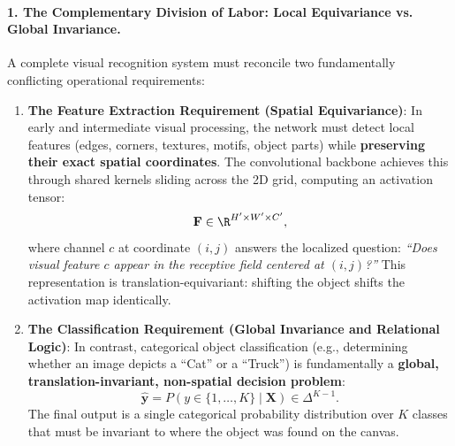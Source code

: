 \paragraph{1. The Complementary Division of Labor: Local Equivariance vs. Global Invariance.}
A complete visual recognition system must reconcile two fundamentally conflicting operational requirements:
\begin{enumerate}[leftmargin=*]
  \item \textbf{The Feature Extraction Requirement (Spatial Equivariance)}: In early and intermediate visual processing, the network must detect local features (edges, corners, textures, motifs, object parts) while \textbf{preserving their exact spatial coordinates}. The convolutional backbone achieves this through shared kernels sliding across the 2D grid, computing an activation tensor:
  \begin{equation}
  \mathbf{F} \in \R^{H' \times W' \times C'},
  \end{equation}
  where channel $c$ at coordinate $(i, j)$ answers the localized question: \textit{``Does visual feature $c$ appear in the receptive field centered at $(i, j)$?''} This representation is translation-equivariant: shifting the object shifts the activation map identically.
  
  \item \textbf{The Classification Requirement (Global Invariance and Relational Logic)}: In contrast, categorical object classification (e.g., determining whether an image depicts a ``Cat'' or a ``Truck'') is fundamentally a \textbf{global, translation-invariant, non-spatial decision problem}:
  \begin{equation}
  \hat{\mathbf{y}} = P(y \in \{1, \dots, K\} \mid \mathbf{X}) \in \Delta^{K-1}.
  \end{equation}
  The final output is a single categorical probability distribution over $K$ classes that must be invariant to where the object was found on the canvas. 
\end{enumerate}

